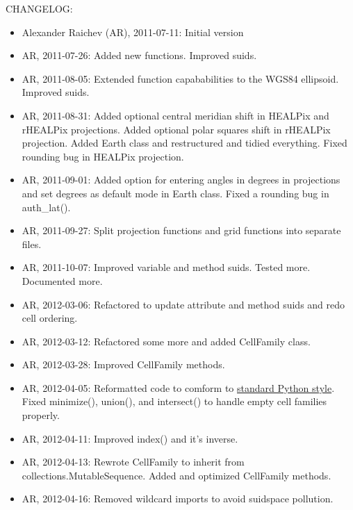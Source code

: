 \documentclass[a4paper,12ptopenany,oneside]{sphinxmanual}
\begin{document}
CHANGELOG:
\begin{itemize}
\item {} 
Alexander Raichev (AR), 2011-07-11: Initial version

\item {} 
AR, 2011-07-26: Added new functions. 
Improved suids.

\item {} 
AR, 2011-08-05: Extended function capababilities 
to the WGS84 ellipsoid. Improved suids.

\item {} 
AR, 2011-08-31: Added optional central meridian shift in 
HEALPix and rHEALPix projections. 
Added optional polar squares shift in rHEALPix projection.
Added Earth class and restructured and tidied everything.
Fixed rounding bug in HEALPix projection.

\item {} 
AR, 2011-09-01: Added option for entering angles in degrees
in projections and set degrees as default mode in Earth class.
Fixed a rounding bug in auth\_lat().

\item {} 
AR, 2011-09-27: Split projection functions and grid 
functions into separate files.

\item {} 
AR, 2011-10-07: Improved variable and method suids. 
Tested more. Documented more.

\item {} 
AR, 2012-03-06: Refactored to update attribute and method suids and
redo cell ordering.

\item {} 
AR, 2012-03-12: Refactored some more and added CellFamily class.

\item {} 
AR, 2012-03-28: Improved CellFamily methods.

\item {} 
AR, 2012-04-05: Reformatted code to comform to 
\href{http://www.python.org/dev/peps/pep-0008/}{standard Python style}. 
Fixed minimize(), union(), and intersect() to handle empty cell families properly.

\item {} 
AR, 2012-04-11: Improved index() and it's inverse.

\item {} 
AR, 2012-04-13: Rewrote CellFamily to inherit from collections.MutableSequence. Added and optimized CellFamily methods.

\item {} 
AR, 2012-04-16: Removed wildcard imports to avoid suidspace pollution.


\end{itemize}
\end{document}
